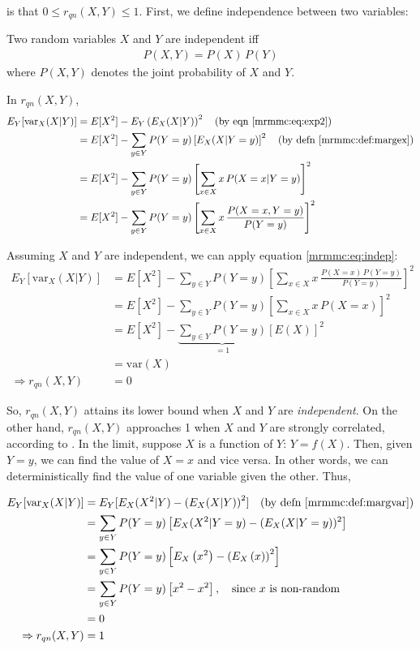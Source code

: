 \documentclass[12pt, twoside, a4paper]{report}
\def\var{\text{var}}
\begin{document}
is that $0 \leq r_{qn}(X, Y) \leq 1$. First, we define independence between two variables:\\

\begin{mydef}[Independence]
Two random variables $X$ and $Y$ are independent iff
\begin{align}
P(X, Y) = P(X) \, P(Y) \label{mrmmc:eq:indep}
\end{align}
where $P(X, Y)$ denotes the joint probability of $X$ and $Y$.
\end{mydef}

In $r_{qn}(X,Y)$,
\begin{align*}
E_Y[\var_X(X|Y)]
&= E[X^2] - E_Y\left( E_X(X|Y) \right)^2 \quad \text{(by eqn \ref{mrmmc:eq:exp2})} \\
&= E[X^2] - \sum_{y\in Y} P(Y=y) \left[ E_X(X|Y=y) \right]^2 \quad \text{(by defn \ref{mrmmc:def:margex})} \\
&= E[X^2] - \sum_{y\in Y} P(Y=y) \left[ \sum_{x \in X} x \, P(X=x|Y=y) \right]^2 \\
&= E[X^2] - \sum_{y\in Y} P(Y=y) \left[ \sum_{x \in X} x \, \frac{P(X=x, Y=y)}{P(Y=y)} \right]^2
\end{align*}

Assuming $X$ and $Y$ are independent, we can apply equation \ref{mrmmc:eq:indep}:
\begin{align*}
E_Y[\var_X(X|Y)]
&= E[X^2] - \sum_{y\in Y} P(Y=y) \left[ \sum_{x \in X} x \, \frac{P(X=x) \, P(Y=y)}{P(Y=y)} \right]^2 \\
&= E[X^2] - \sum_{y\in Y} P(Y=y) \left[ \sum_{x \in X} x \, P(X=x) \right]^2 \\
&= E[X^2] - \underbrace{\sum_{y\in Y} P(Y=y)}_{=1} \left[ E(X) \right]^2 \\
&= \var(X) \\
\Rightarrow r_{qn}(X,Y) &= 0
\end{align*}

So, $r_{qn}(X, Y)$ attains its lower bound when $X$ and $Y$ are \textit{independent}. On the other hand, $r_{qn}(X, Y)$ approaches 1 when $X$ and $Y$ are strongly correlated, according to \cite{RefWorks:187}. In the limit, suppose $X$ is a function of $Y$: $Y=f(X)$. Then, given $Y=y$, we can find the value of $X=x$ and vice versa. In other words, we can deterministically find the value of one variable given the other. Thus,

\begin{align*}
E_Y[\var_X(X|Y)]
&= E_Y [E_X(X^2|Y)-\left( E_X(X|Y) \right)^2 ] \quad \text{(by defn \ref{mrmmc:def:margvar})} \\
&= \sum_{y \in Y} P(Y=y) \left[ E_X(X^2|Y=y)- ( E_X(X|Y=y))^2 \right] \\
&= \sum_{y \in Y} P(Y=y) \left[E_X\left(x^2\right)-\left( E_X\left(x \right) \right)^2 \right] \\
&= \sum_{y \in Y} P(Y=y)  \left[x^2 -x^2 \right] , \quad \text{since $x$ is non-random} \\
&= 0 \\
\Rightarrow r_{qn} (X, Y) &= 1
\end{align*}
\end{document}
